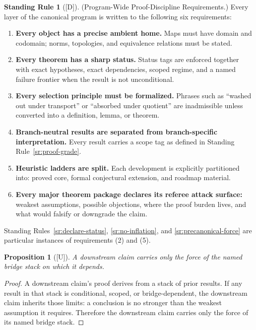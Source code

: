 \documentclass[12pt,oneside]{amsbook}
\theoremstyle{plain}
\newtheorem{proposition}[theorem]{Proposition}
\theoremstyle{definition}
\newtheorem{standingrule}[theorem]{Standing Rule}
\theoremstyle{remark}
\newcommand{\status}[1]{\textup{[#1]}}
\begin{document}
\begin{standingrule}[\status{D}]\label{sr:cmp-standard}
\textup{(Program-Wide Proof-Discipline Requirements.)}
Every layer of the canonical program is written to the following six
requirements:
\begin{enumerate}[label=\textup{(\arabic*)}]
  \item \textbf{Every object has a precise ambient home.}  Maps must
    have domain and codomain; norms, topologies, and equivalence
    relations must be stated.
  \item \textbf{Every theorem has a sharp status.}  Status tags are
    enforced together with exact hypotheses, exact dependencies,
    scoped regime, and a named failure frontier when the result is not
    unconditional.
  \item \textbf{Every selection principle must be formalized.}
    Phrases such as ``washed out under transport'' or ``absorbed under
    quotient'' are inadmissible unless converted into a definition,
    lemma, or theorem.
  \item \textbf{Branch-neutral results are separated from
    branch-specific interpretation.}  Every result carries a scope
    tag as defined in Standing Rule~\ref{sr:proof-grade}.
  \item \textbf{Heuristic ladders are split.}  Each development is
    explicitly partitioned into: proved core, formal conjectural
    extension, and roadmap material.
  \item \textbf{Every major theorem package declares its referee
    attack surface:} weakest assumptions, possible objections, where
    the proof burden lives, and what would falsify or downgrade the
    claim.
\end{enumerate}
Standing Rules~\ref{sr:declare-status}, \ref{sr:no-inflation}, and
\ref{sr:precanonical-force} are particular instances of requirements
(2) and (5).
\end{standingrule}

\begin{proposition}[\status{U}]\label{prop:downstream-force}
A downstream claim carries only the force of the named bridge stack
on which it depends.
\end{proposition}

\begin{proof}
A downstream claim's proof derives from a stack of prior results.  If
any result in that stack is conditional, scoped, or bridge-dependent,
the downstream claim inherits those limits: a conclusion is no stronger
than the weakest assumption it requires.  Therefore the downstream
claim carries only the force of its named bridge stack.
\end{proof}
\end{document}
